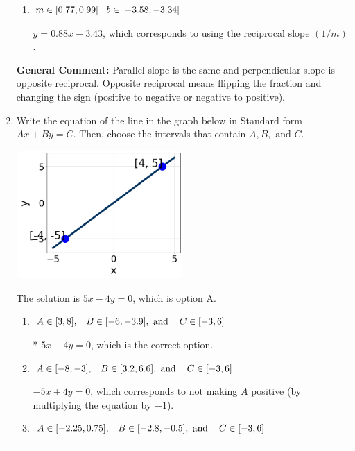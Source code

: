 \documentclass{extbook}[14pt]
\newcommand{\litem}[1]{\item #1

\rule{\textwidth}{0.4pt}}
\begin{document}
\begin{enumerate}
{\begin{enumerate}[label=\Alph*.]
 $y = 1.14x - 4.00$, which corresponds to correct slope and mis-distributing while simplifying to slope-intercept form.
\item \( m \in [0.77, 0.99] \hspace*{3mm} b \in [-3.58, -3.34] \)

 $y = 0.88x - 3.43$, which corresponds to using the reciprocal slope $(1/m)$.
\end{enumerate}

\textbf{General Comment:} Parallel slope is the same and perpendicular slope is opposite reciprocal. Opposite reciprocal means flipping the fraction and changing the sign (positive to negative or negative to positive).
}
\litem{
Write the equation of the line in the graph below in Standard form $Ax+By=C$. Then, choose the intervals that contain $A, B, \text{ and } C$.

\begin{center}
    \includegraphics[width=0.5\textwidth]{../Figures/linearGraphToStandardCopyA.png}
\end{center}


The solution is \( 5x - 4y = 0 \), which is option A.\begin{enumerate}[label=\Alph*.]
\item \( A \in [3, 8], \hspace{3mm} B \in [-6, -3.9], \text{ and } \hspace{3mm} C \in [-3, 6] \)

* $5x - 4y = 0$, which is the correct option.
\item \( A \in [-8, -3], \hspace{3mm} B \in [3.2, 6.6], \text{ and } \hspace{3mm} C \in [-3, 6] \)

 $-5x + 4y = 0$, which corresponds to not making $A$ positive (by multiplying the equation by $-1$).
\item \( A \in [-2.25, 0.75], \hspace{3mm} B \in [-2.8, -0.5], \text{ and } \hspace{3mm} C \in [-3, 6] \)


\end{enumerate}}
\end{enumerate}
\end{document}
